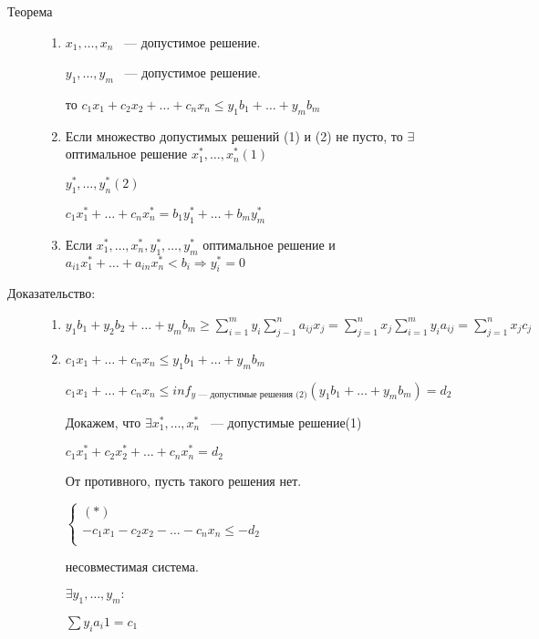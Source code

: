 \documentclass[12pt]{article}
\begin{document}
\begin{description}
\item[Теорема]
\begin{enumerate}
\item $x_1, \ldots, x_n$ ~--- допустимое решение.

$y_1, \ldots, y_m$ ~--- допустимое решение.

то $c_1 x_1 + c_2 x_2 + \ldots + c_n x_n \le y_1 b_1 + \ldots + y_m b_m$

\item Если множество допустимых решений (1) и (2) не пусто, то $\exists$ оптимальное решение $x_1^*, \ldots, x_n^*(1)$ 

$y_1^*, \ldots, y_n^* (2)$

$c_1 x_1^* + \ldots + c_n x_n^* = b_1 y_1^* + \ldots + b_m y_m^*$

\item Если $x_1^*, \ldots, x_n^*, y_1^*, \ldots, y_m^*$  оптимальное решение и $a_{i1}x_1^* + \ldots + a_{in}x_n^* < b_i \Rightarrow y_i^* = 0$
\end{enumerate}

\item[Доказательство:]

\begin{enumerate}
\item $y_1b_1 + y_2b_2 + \ldots + y_m b_m \ge \sum_{i = 1}^{m}y_i\sum_{j - 1}^{n}a_{ij}x_j = \sum_{j = 1}^{n}x_j \sum_{i = 1}^{m}y_i a_{ij} = \sum_{j = 1}^{n}x_jc_j$

\item $c_1 x_1 + \ldots + c_n x_n \le y_1 b_1 + \ldots + y_m b_m$

$c_1 x_1 + \ldots + c_n x_n \le inf_{y \text{~--- допустимые решения (2)}}(y_1 b_1 + \ldots + y_m b_m) = d_2$

Докажем, что $\exists x_1^*, \ldots, x_n^*$ ~--- допустимые решение(1)

$c_1 x_1^* + c_2 x_2^* + \ldots + c_n x_n^* = d_2$

От противного, пусть такого решения нет. 

$\begin{cases} (*)\\ -c_1x_1 - c_2x_2 - \ldots - c_nx_n \le -d_2 \\ \end{cases}$

несовместимая система.

$\exists y_1, \ldots, y_m:$

$\sum y_i a_i1 = c_1$


\end{enumerate}
\end{description}
\end{document}
